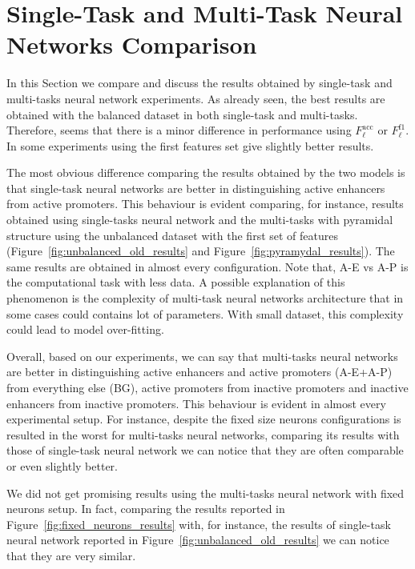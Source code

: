 \section{Single-Task and Multi-Task Neural Networks Comparison}
\label{sec:results_discussion}
In this Section we compare and discuss the results obtained by single-task and multi-tasks neural network experiments. As already seen, the best results are obtained with the balanced dataset in both single-task and multi-tasks. Therefore, seems that there is a minor difference in performance using $F_\ell^{\textrm{acc}}$ or $F_\ell^{\textrm{f1}}$. In some experiments using the first features set give slightly better results. 

The most obvious difference comparing the results obtained by the two models is that single-task neural networks are better in distinguishing active enhancers from active promoters. This behaviour is evident comparing, for instance, results obtained using single-tasks neural network and the multi-tasks with pyramidal structure using the unbalanced dataset with the first set of features (Figure~\ref{fig:unbalanced_old_results} and Figure~\ref{fig:pyramydal_results}). The same results are obtained in almost every configuration. Note that, A-E vs A-P is the computational task with less data. A possible explanation of this phenomenon is the complexity of multi-task neural networks architecture that in some cases could contains lot of parameters. With small dataset, this complexity could lead to model over-fitting. 

Overall, based on our experiments, we can say that multi-tasks neural networks are better in distinguishing active enhancers and active promoters (A-E+A-P) from everything else (BG), active promoters from inactive promoters and inactive enhancers from inactive promoters. This behaviour is evident in almost every experimental setup. For instance, despite the fixed size neurons configurations is resulted in the worst for multi-tasks neural networks, comparing its results with those of single-task neural network we can notice that they are often comparable or even slightly better.

We did not get promising results using the multi-tasks neural network with fixed neurons setup. In fact, comparing the results reported in Figure~\ref{fig:fixed_neurons_results} with, for instance, the results of single-task neural network reported in Figure~\ref{fig:unbalanced_old_results} we can notice that they are very similar.

